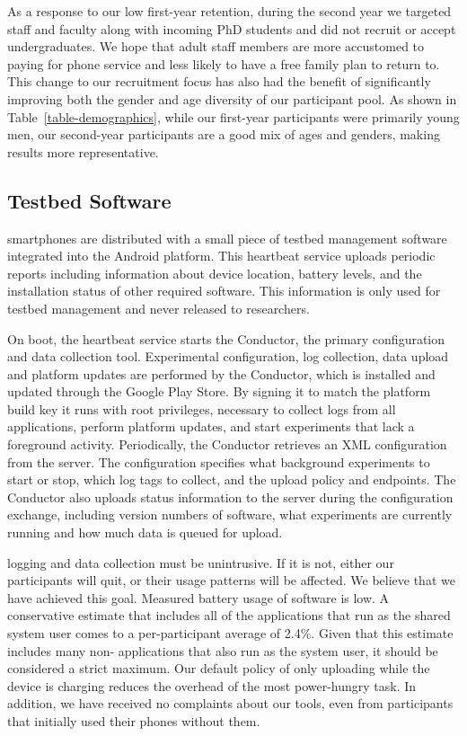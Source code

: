 As a response to our low first-year retention, during the second year we
targeted staff and faculty along with incoming PhD students and did not
recruit or accept undergraduates. We hope that adult staff members are more
accustomed to paying for phone service and less likely to have a free family
plan to return to. This change to our recruitment focus has also had the
benefit of significantly improving both the gender and age diversity of our
participant pool. As shown in Table~\ref{table-demographics}, while our
first-year participants were primarily young men, our second-year
participants are a good mix of ages and genders, making results more
representative.

\subsection{Testbed Software}

\PhoneLab{} smartphones are distributed with a small piece of testbed
management software integrated into the Android platform. This heartbeat
service uploads periodic reports including information about device location,
battery levels, and the installation status of other required \PhoneLab{}
software. This information is only used for testbed management and never
released to researchers.

On boot, the heartbeat service starts the \PhoneLab{} Conductor, the primary
\PhoneLab{} configuration and data collection tool. Experimental
configuration, log collection, data upload and platform updates are performed
by the Conductor, which is installed and updated through the Google Play
Store. By signing it to match the platform build key it runs with root
privileges, necessary to collect logs from all applications, perform platform
updates, and start experiments that lack a foreground activity. Periodically,
the Conductor retrieves an XML configuration from the \PhoneLab{} server. The
configuration specifies what background experiments to start or stop, which
log tags to collect, and the upload policy and endpoints. The Conductor also
uploads status information to the server during the configuration exchange,
including version numbers of \PhoneLab{} software, what experiments are
currently running and how much data is queued for upload.

\PhoneLab{} logging and data collection must be unintrusive. If it is not,
either our participants will quit, or their usage patterns will be affected.
We believe that we have achieved this goal. Measured battery usage of
\PhoneLab{} software is low. A conservative estimate that includes all of the
applications that run as the shared system user comes to a per-participant
average of 2.4\%. Given that this estimate includes many non-\PhoneLab{}
applications that also run as the system user, it should be considered a
strict maximum. Our default policy of only uploading while the device is
charging reduces the overhead of the most power-hungry task. In addition, we
have received no complaints about our tools, even from participants that
initially used their phones without them.

